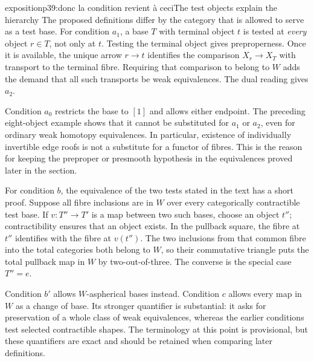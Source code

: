 \begin{dcomment}{exposition}{p39:donc la condition revient à ceci}{The test objects explain the hierarchy}
The proposed definitions differ by the category that is allowed to serve as a test base. For condition $a_1$, a base $T$ with terminal object $t$ is tested at \emph{every} object $r\in T$, not only at $t$. Testing the terminal object gives preproperness. Once it is available, the unique arrow $r\to t$ identifies the comparison $X_r\to X_T$ with transport to the terminal fibre. Requiring that comparison to belong to $W$ adds the demand that all such transports be weak equivalences. The dual reading gives $a_2$.

Condition $a_0$ restricts the base to $[1]$ and allows either endpoint. The preceding eight-object example shows that it cannot be substituted for $a_1$ or $a_2$, even for ordinary weak homotopy equivalences. In particular, existence of individually invertible edge roofs is not a substitute for a functor of fibres. This is the reason for keeping the preproper or presmooth hypothesis in the equivalences proved later in the section.

For condition $b$, the equivalence of the two tests stated in the text has a short proof. Suppose all fibre inclusions are in $W$ over every categorically contractible test base. If $v:T''\to T'$ is a map between two such bases, choose an object $t''$; contractibility ensures that an object exists. In the pullback square, the fibre at $t''$ identifies with the fibre at $v(t'')$. The two inclusions from that common fibre into the total categories both belong to $W$, so their commutative triangle puts the total pullback map in $W$ by two-out-of-three. The converse is the special case $T''=e$.

Condition $b'$ allows $W$-aspherical bases instead. Condition $c$ allows every map in $W$ as a change of base. Its stronger quantifier is substantial: it asks for preservation of a whole class of weak equivalences, whereas the earlier conditions test selected contractible shapes. The terminology at this point is provisional, but these quantifiers are exact and should be retained when comparing later definitions.
\end{dcomment}

